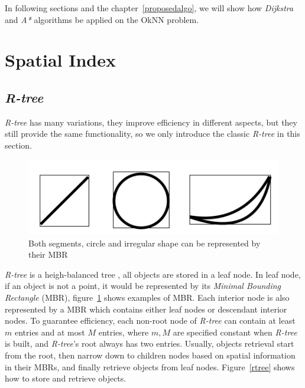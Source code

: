 In following sections and the chapter~\ref{proposedalgo}, we will show how \textit{Dijkstra} and
\textit{A*} algorithms be applied on the OkNN problem.

\section{Spatial Index}\label{lrindex}

\subsection{\textit{R-tree}}

\textit{R-tree} has many variations\cite{guttman1984r,beckmann1990r,sellis1987r+,kamel1993hilbert},
they improve efficiency in different aspects,
but they still provide the same functionality,
so we only introduce the classic \textit{R-tree} in this section.

\begin{figure}[htp]
  \centering
  \includegraphics[width=.8\linewidth]{./pic/mbr.png}
  \caption{\small Both segments, circle and irregular shape can be represented by their MBR}
  \label{mbr}
\end{figure}

\textit{R-tree} is a heigh-balanced tree \cite{guttman1984r}, all objects are stored in a leaf
node. In leaf node, if an object is not a point, it would be represented by its \textit{Minimal Bounding
Rectangle} (MBR), figure~\ref{mbr} shows examples of MBR. Each interior node is also
represented by a MBR which contains either leaf nodes or descendant interior nodes.
To guarantee efficiency, each non-root node of \textit{R-tree} can contain at least $m$ entries
and at most $M$ entries, where $m, M$ are specified constant when \textit{R-tree} is built, and
\textit{R-tree}'s root always has two entries. 
Usually, objects retrieval start from the root,
then narrow down to children nodes based on spatial information in their MBRs, and finally
retrieve objects from leaf nodes.
Figure~\ref{rtree} shows how to store and retrieve objects.

